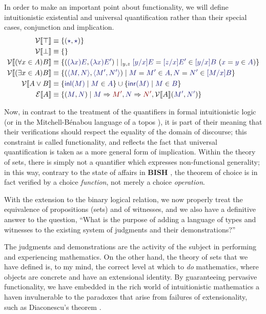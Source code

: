 \documentclass[11pt]{amsart}
\theoremstyle{definition}
\theoremstyle{remark}
\numberwithin{equation}{section}
\def\InputModeColorName{MidnightBlue}
\def\OutputModeColorName{Maroon}
\newcommand\InputMode[1]{{\color{\InputModeColorName}{#1}}}
\newcommand\OutputMode[1]{{\color{\OutputModeColorName}{#1}}}
\newcommand\HypJ[2]{#1\ (#2)}
\newcommand\GenJ[2]{\vert_{#1}\; #2}
\newcommand\Member[2]{\InputMode{#1}\in \InputMode{#2}}
\newcommand\EqMember[3]{\InputMode{#1}=\InputMode{#2}\in \InputMode{#3}}
\newcommand\Eval[2]{\InputMode{#1}\Rightarrow \OutputMode{#2}}
\newcommand\SEM[1]{\llbracket#1 \rrbracket}
\newcommand\VAL[1]{\mathcal{V}\SEM{#1}}
\newcommand\EXP[1]{\mathcal{E}\SEM{#1}}
\newcommand\True{\top}
\newcommand\False{\bot}
\newcommand\Disj[2]{#1\lor #2}
\newcommand\Forall[3]{(\forall #2 \in #1)#3}
\newcommand\Exists[3]{(\exists #2 \in #1)#3}
\newcommand\It{\star}
\newcommand\Lam[2]{(\lambda #1) #2}
\newcommand\Pair[2]{\langle #1, #2 \rangle}
\newcommand\Inl[1]{\mathsf{inl}(#1)}
\newcommand\Inr[1]{\mathsf{inr}(#1)}
\newcommand\BISH{\textbf{BISH}}
\begin{document}
In order to make an important point about functionality, we will define
intuitionistic existential and universal quantification rather than their
special cases, conjunction and implication.
%
\begin{align*}
  \VAL{\True} &\equiv \{(\InputMode{\It}, \InputMode{\It})\}\\
  \VAL{\False} &\equiv \{\}\\
  \VAL{\Forall{A}{x}{B}} &\equiv 
    \{ (\InputMode{\Lam{x}{E}}, \InputMode{\Lam{x}{E'}})
    \mid \GenJ{y,z}{
      \HypJ{\EqMember{[y/x]E}{[z/x]E'}{[y/x]B}}{\EqMember{x}{y}{A}}
    }
    \}\\
  \VAL{\Exists{A}{x}{B}} &\equiv
    \{ (\InputMode{\Pair{M}{N}}, \InputMode{\Pair{M'}{N'}})
    \mid \EqMember{M}{M'}{A}, \EqMember{N}{N'}{[M/x]B}
    \}\\
  \VAL{\Disj{A}{B}} &\equiv
    \{ \InputMode{\Inl{M}}
    \mid \Member{M}{A}
    \} \cup
    \{ \InputMode{\Inr{M}}
    \mid \Member{M}{B}
    \}\\
  \EXP{A} &\equiv
    \{ (\InputMode{M}, \InputMode{N})
    \mid \Eval{M}{M'}, \Eval{N}{N'}, \VAL{A}(\InputMode{M'}, \InputMode{N'})
    \}
\end{align*}

Now, in contrast to the treatment of the quantifiers in formal intuitionistic
logic (or in the Mitchell-B\'enabou language of a topos
\cite{maclane-moerdijk}), it is part of their meaning that their verifications
should respect the equality of the domain of discourse; this constraint is
called functionality, and reflects the fact that universal quantification is
taken as a more general form of implication. Within the theory of sets, there is
simply not a quantifier which expresses non-functional generality; in this way,
contrary to the state of affairs in \BISH{} \cite{bishop:1967}, the theorem of
choice is in fact verified by a choice \emph{function}, not merely a choice
\emph{operation}.

With the extension to the binary logical relation, we now properly treat the
equivalence of propositions (sets) and of witnesses, and we also have a
definitive answer to the question, ``What is the purpose of adding a language of
types and witnesses to the existing system of judgments and their
demonstrations?''

The judgments and demonstrations are the activity of the subject in performing
and experiencing mathematics. On the other hand, the theory of sets that we have
defined is, to my mind, the correct level at which to \emph{do} mathematics,
where objects are concrete and have an extensional identity. By guaranteeing
pervasive functionality, we have embedded in the rich world of intuitionistic
mathematics a haven invulnerable to the paradoxes that arise from failures of
extensionality, such as Diaconescu's theorem \cite{sterling:diaconescu}.
\end{document}
